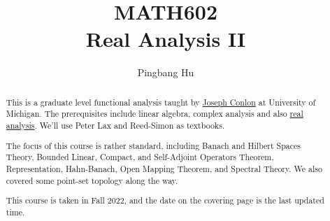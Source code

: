 \documentclass[a4paper]{report}
\author{Pingbang Hu}
\title{MATH602\\Real Analysis II}
\begin{document}
\maketitle

\begin{abstract}
	This is a graduate level functional analysis taught by \href{https://lsa.umich.edu/math/people/faculty/conlon.html}{Joseph Conlon} at University of Michigan. The prerequisites include linear algebra, complex analysis and also \href{https://www.pbb.wtf/posts/Notes#real-analysis-math597-umich}{real analysis}. We'll use Peter Lax\cite{lax2002functional} and Reed-Simon\cite{reed1980functional} as textbooks.

	The focus of this course is rather standard, including Banach and Hilbert Spaces Theory, Bounded Linear, Compact, and Self-Adjoint Operators Theorem, Representation, Hahn-Banach, Open Mapping Theorem, and Spectral Theory. We also covered some point-set topology along the way.

	\vfill
	This course is taken in Fall 2022, and the date on the covering page is the last updated time.
\end{abstract}

\tableofcontents


\newpage
\appendix
\appendixpage



\newpage
\printbibliography
\end{document}
